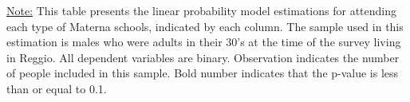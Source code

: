 \begin{footnotesize}
\noindent\underline{Note:} This table presents the linear probability model estimations for attending each type of Materna schools, indicated by each column. The sample used in this estimation is males who were adults in their 30's at the time of the survey living in Reggio. All dependent variables are binary. Observation indicates the number of people included in this sample. Bold number indicates that the p-value is less than or equal to 0.1.
\end{footnotesize}
